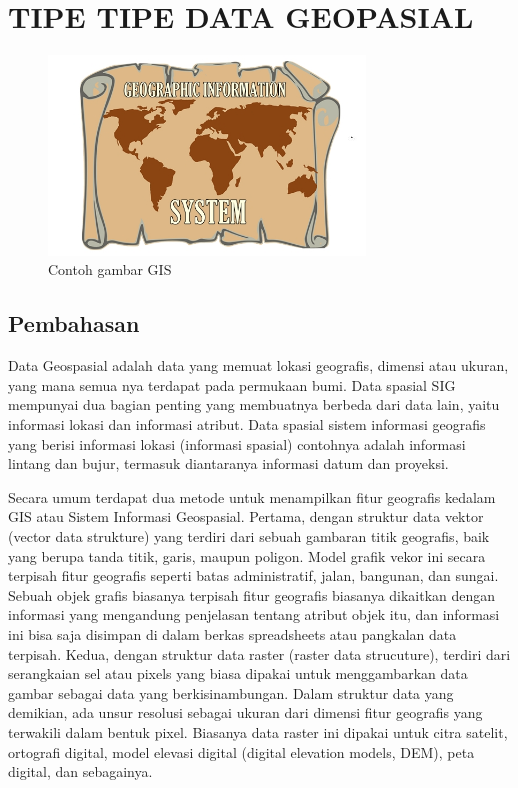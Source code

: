 \section{TIPE TIPE DATA GEOPASIAL}
\begin{figure}[htbp]
		\centering
		\includegraphics[width=0.75\textwidth]{pictures/gis.jpg}
		\caption{Contoh gambar GIS}
		\label{labelgambar1}
		\end{figure}	
\subsection{Pembahasan}

Data Geospasial adalah data yang memuat lokasi geografis, dimensi atau ukuran, yang mana semua nya terdapat pada permukaan bumi. Data spasial SIG mempunyai dua bagian penting yang membuatnya berbeda dari data lain, yaitu informasi lokasi dan informasi atribut. Data spasial sistem informasi geografis yang berisi informasi lokasi (informasi spasial) contohnya adalah informasi lintang dan bujur, termasuk diantaranya informasi datum dan proyeksi.

Secara umum terdapat dua metode untuk menampilkan fitur geografis kedalam GIS  atau Sistem Informasi Geospasial. Pertama, dengan struktur data vektor (vector data strukture) yang terdiri dari sebuah gambaran titik geografis, baik yang berupa tanda titik, garis, maupun poligon. Model grafik vekor ini secara terpisah fitur geografis seperti batas  administratif, jalan, bangunan, dan sungai. Sebuah objek grafis biasanya terpisah fitur geografis biasanya dikaitkan dengan informasi yang mengandung penjelasan tentang atribut objek itu, dan informasi ini bisa saja disimpan di dalam berkas spreadsheets atau pangkalan data terpisah. Kedua, dengan struktur data raster (raster data strucuture), terdiri dari serangkaian sel atau pixels yang biasa dipakai untuk menggambarkan data gambar sebagai data yang berkisinambungan. Dalam struktur data yang demikian, ada unsur resolusi sebagai ukuran dari dimensi fitur geografis yang terwakili dalam bentuk pixel. Biasanya data raster ini dipakai untuk citra satelit, ortografi digital, model elevasi digital (digital elevation models, DEM), peta digital, dan sebagainya.

